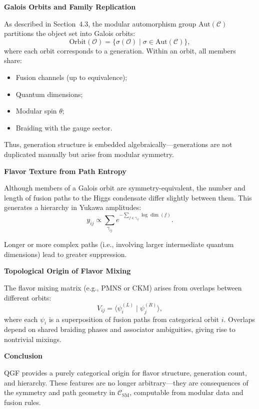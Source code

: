 \documentclass[11pt]{article}
\def\left{}
\def\right{}
\begin{document}
\vspace{0.5em}
\noindent\textbf{Galois Orbits and Family Replication}

As described in Section~4.3, the modular automorphism group \( \text{Aut}(\mathcal{C}) \) partitions the object set into Galois orbits:
\[
\text{Orbit}(\mathcal{O}) = \left\{ \sigma(\mathcal{O}) \mid \sigma \in \text{Aut}(\mathcal{C}) \right\},
\]
where each orbit corresponds to a generation. Within an orbit, all members share:
\begin{itemize}
  \item Fusion channels (up to equivalence);
  \item Quantum dimensions;
  \item Modular spin \( \theta \);
  \item Braiding with the gauge sector.
\end{itemize}

Thus, generation structure is embedded algebraically—generations are not duplicated manually but arise from modular symmetry.

\vspace{0.5em}
\noindent\textbf{Flavor Texture from Path Entropy}

Although members of a Galois orbit are symmetry-equivalent, the number and length of fusion paths to the Higgs condensate differ slightly between them. This generates a hierarchy in Yukawa amplitudes:
\[
y_{ij} \propto \sum_{\gamma_{ij}} e^{-\sum_{f \in \gamma_{ij}} \log \dim(f)}.
\]

Longer or more complex paths (i.e., involving larger intermediate quantum dimensions) lead to greater suppression.

\vspace{0.5em}
\noindent\textbf{Topological Origin of Flavor Mixing}

The flavor mixing matrix (e.g., PMNS or CKM) arises from overlaps between different orbits:
\[
V_{ij} = \left\langle \psi_i^{(L)} \mid \psi_j^{(R)} \right\rangle,
\]
where each \( \psi_i \) is a superposition of fusion paths from categorical orbit \( i \). Overlaps depend on shared braiding phases and associator ambiguities, giving rise to nontrivial mixings.

\vspace{0.5em}
\noindent\textbf{Conclusion}

QGF provides a purely categorical origin for flavor structure, generation count, and hierarchy. These features are no longer arbitrary—they are consequences of the symmetry and path geometry in \( \mathcal{C}_{\text{SM}} \), computable from modular data and fusion rules.
\end{document}
